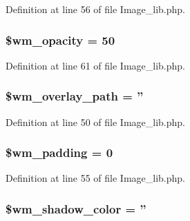 Definition at line 56 of file Image\-\_\-lib.\-php.

\hypertarget{class_c_i___image__lib_a9cc2d95dbcbb26a2f3f0c7416fc5920b}{
\subsubsection[{\$wm\-\_\-opacity}]{\setlength{\rightskip}{0pt plus 5cm}\$wm\-\_\-opacity = 50}}\label{class_c_i___image__lib_a9cc2d95dbcbb26a2f3f0c7416fc5920b}


Definition at line 61 of file Image\-\_\-lib.\-php.

\hypertarget{class_c_i___image__lib_a82ec5b8a6822dc7f9c70f4b5aafdebd4}{
\subsubsection[{\$wm\-\_\-overlay\-\_\-path}]{\setlength{\rightskip}{0pt plus 5cm}\$wm\-\_\-overlay\-\_\-path = ''}}\label{class_c_i___image__lib_a82ec5b8a6822dc7f9c70f4b5aafdebd4}


Definition at line 50 of file Image\-\_\-lib.\-php.

\hypertarget{class_c_i___image__lib_ab1f63f5ae604d060dbc39653f6440826}{
\subsubsection[{\$wm\-\_\-padding}]{\setlength{\rightskip}{0pt plus 5cm}\$wm\-\_\-padding = 0}}\label{class_c_i___image__lib_ab1f63f5ae604d060dbc39653f6440826}


Definition at line 55 of file Image\-\_\-lib.\-php.

\hypertarget{class_c_i___image__lib_aca292b49514fe3238440675c4b2642ca}{
\subsubsection[{\$wm\-\_\-shadow\-\_\-color}]{\setlength{\rightskip}{0pt plus 5cm}\$wm\-\_\-shadow\-\_\-color = ''}}\label{class_c_i___image__lib_aca292b49514fe3238440675c4b2642ca}


